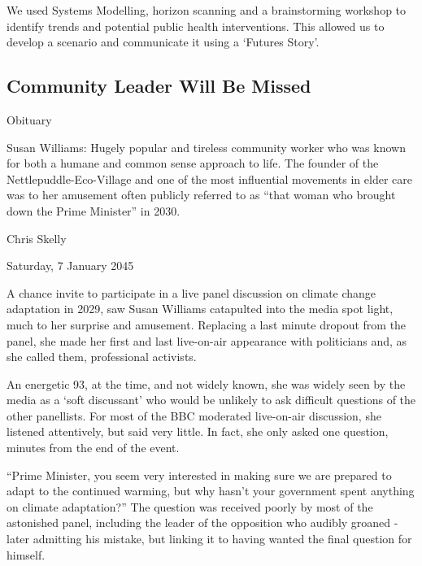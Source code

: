 We used Systems Modelling, horizon scanning and a brainstorming workshop to identify trends and potential public health interventions. This allowed us to develop a scenario and communicate it using a `Futures Story'.

\subsection{Community Leader Will Be Missed} 
Obituary

Susan Williams: Hugely popular and tireless community worker who was known for both a humane and common sense approach to life. The founder of the Nettlepuddle-Eco-Village and one of the most influential movements in elder care was to her amusement often publicly referred to as ``that woman who brought down the Prime Minister'' in 2030.

Chris Skelly

Saturday, 7 January 2045

A chance invite to participate in a live panel discussion on climate change adaptation in 2029, saw Susan Williams catapulted into the media spot light, much to her surprise and amusement. Replacing a last minute dropout from the panel, she made her first and last live-on-air appearance with politicians and, as she called them, professional activists.

An energetic 93, at the time, and not widely known, she was widely seen by the media as a `soft discussant' who would be unlikely to ask difficult questions of the other panellists. For most of the BBC moderated live-on-air discussion, she listened attentively, but said very little. In fact, she only asked one question, minutes from the end of the event.

``Prime Minister, you seem very interested in making sure we are prepared to adapt to the continued warming, but why hasn't your government spent anything on climate adaptation?'' The question was received poorly by most of the astonished panel, including the leader of the opposition who audibly groaned - later admitting his mistake, but linking it to having wanted the final question for himself.

